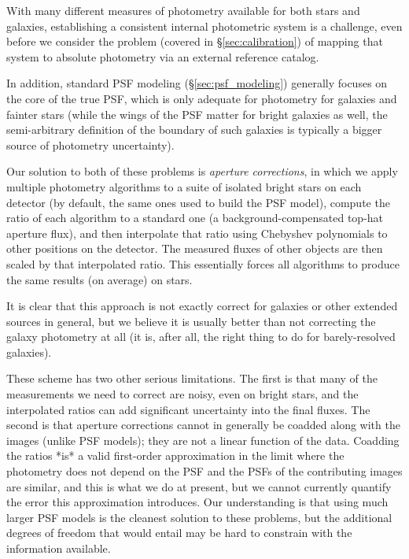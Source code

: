 With many different measures of photometry available for both stars and galaxies, establishing a consistent internal photometric system is a challenge, even before we consider the problem (covered in \S\ref{sec:calibration}) of mapping that system to absolute photometry via an external reference catalog.

In addition, standard PSF modeling (\S\ref{sec:psf_modeling}) generally focuses on the core of the true PSF, which is only adequate for photometry for galaxies and fainter stars (while the wings of the PSF matter for bright galaxies as well, the semi-arbitrary definition of the boundary of such galaxies is typically a bigger source of photometry uncertainty).

Our solution to both of these problems is \emph{aperture corrections}, in which we apply multiple photometry algorithms to a suite of isolated bright stars on each detector (by default, the same ones used to build the PSF model), compute the ratio of each algorithm to a standard one (a background-compensated top-hat aperture flux), and then interpolate that ratio using Chebyshev polynomials to other positions on the detector.
The measured fluxes of other objects are then scaled by that interpolated ratio.
This essentially forces all algorithms to produce the same results (on average) on stars.

It is clear that this approach is not exactly correct for galaxies or other extended sources in general, but we believe it is usually better than not correcting the galaxy photometry at all (it is, after all, the right thing to do for barely-resolved galaxies).

These scheme has two other serious limitations.
The first is that many of the measurements we need to correct are noisy, even on bright stars, and the interpolated ratios can add significant uncertainty into the final fluxes.
The second is that aperture corrections cannot in generally be coadded along with the images (unlike PSF models); they are not a linear function of the data.
Coadding the ratios *is* a valid first-order approximation in the limit where the photometry does not depend on the PSF and the PSFs of the contributing images are similar, and this is what we do at present, but we cannot currently  quantify the error this approximation introduces.
Our understanding is that using much larger PSF models is the cleanest solution to these problems, but the additional degrees of freedom that would entail may be hard to constrain with the information available.


